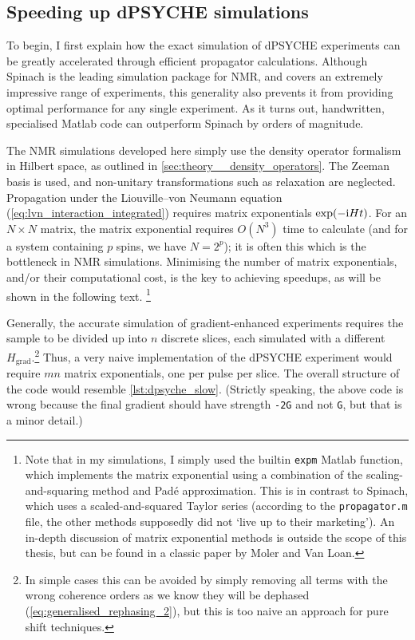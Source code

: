 \subsection{Speeding up dPSYCHE simulations}
\label{subsec:pureshift__dpsyche_simulations}

To begin, I first explain how the exact simulation of dPSYCHE experiments can be greatly accelerated through efficient propagator calculations.
Although Spinach\autocite{Hogben2011JMR} is the leading simulation package for NMR, and covers an extremely impressive range of experiments, this generality also prevents it from providing optimal performance for any single experiment.
As it turns out, handwritten, specialised Matlab code can outperform Spinach by orders of magnitude.

The NMR simulations developed here simply use the density operator formalism in Hilbert space, as outlined in \cref{sec:theory__density_operators}.
The Zeeman basis is used, and non-unitary transformations such as relaxation are neglected.
Propagation under the Liouville--von Neumann equation (\cref{eq:lvn_interaction_integrated}) requires matrix exponentials $\exp(-\mathrm{i} H t)$.
For an $N \times N$ matrix, the matrix exponential requires $O(N^3)$ time to calculate (and for a system containing $p$ spins, we have $N = 2^p$); it is often this which is the bottleneck in NMR simulations.
Minimising the number of matrix exponentials, and/or their computational cost, is the key to achieving speedups, as will be shown in the following text.%
\footnote{Note that in my simulations, I simply used the builtin \texttt{expm} Matlab function, which implements the matrix exponential using a combination of the scaling-and-squaring method and Pad\'e approximation\autocite{Higham2005SIAMJMAA}.
This is in contrast to Spinach, which uses a scaled-and-squared Taylor series (according to the \texttt{propagator.m} file, the other methods supposedly did not `live up to their marketing').
An in-depth discussion of matrix exponential methods is outside the scope of this thesis, but can be found in a classic paper by Moler and Van Loan\autocite{Moler2003SIAMR}.}

Generally, the accurate simulation of gradient-enhanced experiments requires the sample to be divided up into $n$ discrete slices, each simulated with a different $H_\text{grad}$.\footnote{In simple cases this can be avoided by simply removing all terms with the wrong coherence orders as we know they will be dephased (\cref{eq:generalised_rephasing_2}), but this is too naive an approach for pure shift techniques.}
Thus, a very naive implementation of the dPSYCHE experiment would require $mn$ matrix exponentials, one per pulse per slice.
The overall structure of the code would resemble \cref{lst:dpsyche_slow}.
(Strictly speaking, the above code is wrong because the final gradient should have strength \texttt{-2G} and not \texttt{G}, but that is a minor detail.)

